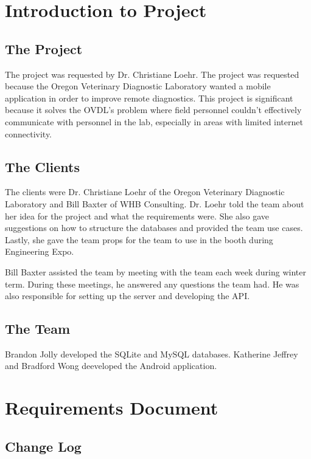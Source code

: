 \documentclass[onecolumn, draftclsnofoot,10pt, compsoc]{IEEEtran}
\begin{document}
\begin{titlepage}
\begin{singlespace}
\begin{abstract}
        \end{abstract}     
    \end{singlespace}
\end{titlepage}
\newpage
{}
\tableofcontents
\clearpage

\section{Introduction to Project}
\subsection{The Project}
The project was requested by Dr. Christiane Loehr. The project was requested because the Oregon Veterinary Diagnostic Laboratory wanted a mobile application in order to improve remote diagnostics. This project is significant because it solves the OVDL's problem where field personnel couldn't effectively communicate with personnel in the lab, especially in areas with limited internet connectivity.
\subsection{The Clients}
The clients were Dr. Christiane Loehr of the Oregon Veterinary Diagnostic Laboratory and Bill Baxter of WHB Consulting. Dr. Loehr told the team about her idea for the project and what the requirements were. She also gave suggestions on how to structure the databases and provided the team use cases. Lastly, she gave the team props for the team to use in the booth during Engineering Expo.

Bill Baxter assisted the team by meeting with the team each week during winter term. During these meetings, he answered any questions the team had. He was also responsible for setting up the server and developing the API.

\subsection{The Team}
Brandon Jolly developed the SQLite and MySQL databases. Katherine Jeffrey and Bradford Wong deeveloped the Android application.
 \section{Requirements Document}
 
 \subsection{Change Log}
\end{document}
